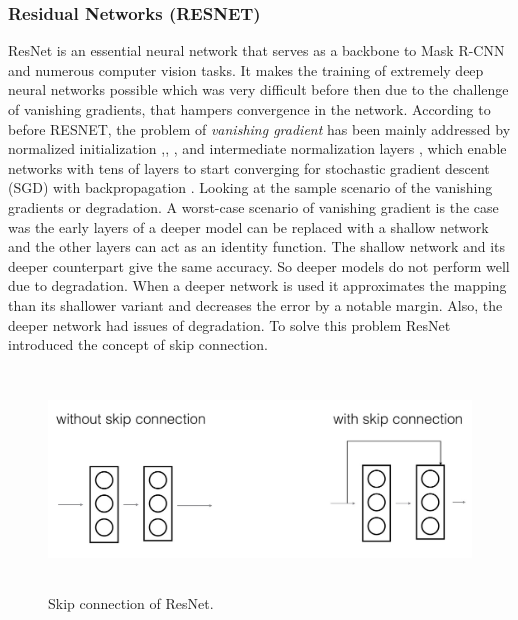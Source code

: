 \subsubsection{Residual Networks (RESNET)}
ResNet is an essential neural network that serves as a backbone to Mask R-CNN and numerous computer vision tasks. 
It makes the training of extremely deep neural networks possible which was very difficult before then due to the 
challenge of vanishing gradients, that hampers convergence in the network. According to \cite{M} before RESNET, the problem 
of \textit{vanishing gradient} has been mainly addressed by normalized initialization \cite{N},\cite{O}, \cite{P}, \cite{Q} and intermediate 
normalization layers \cite{R}, which enable networks with tens of layers to start converging for stochastic gradient descent 
(SGD) with backpropagation \cite{S}.
Looking at the sample scenario of the vanishing gradients or degradation. A worst-case scenario of vanishing gradient is
 the case was the early layers of a deeper model can be replaced with a shallow network and the other layers can act as an identity function.  The shallow network and its deeper counterpart give the same accuracy. So deeper models do not perform well due to degradation. When a deeper network is used it approximates the mapping than its shallower variant and decreases the error by a notable margin. 
 Also, the deeper network had issues of degradation.
To solve this problem ResNet introduced the concept of skip connection.

\begin{figure}[H]
 \centering
 \includegraphics[height=2.3in]{images/skipconnection.jpg}
 \caption{Skip connection of ResNet.}
\end{figure}

